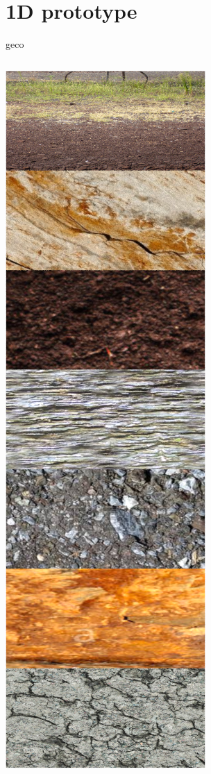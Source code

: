 \documentclass{beamer}
\begin{document}
\section{1D prototype}
\begin{frame}{geco}
\begin{columns}
\begin{column}{0.2\textwidth}
\includegraphics[width=0.9\columnwidth]{figure/gecoover}

\end{column}
\end{columns}
\end{frame}
\end{document}
